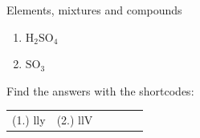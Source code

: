\begin{exercises}{Elements, mixtures and compounds}
{\begin{enumerate}[noitemsep, label=\textbf{\arabic*}. ]
\begin{enumerate}[noitemsep, label=\textbf{\alph*}. ]
\label{m38708*uid33}\item $\text{H}{}_{2}\text{SO}{}_{4}$\label{m38708*uid34}\item $\text{SO}{}_{3}$\end{enumerate}
                \end{enumerate}
    \label{m38708*cid4}
\par {} Find the answers with the shortcodes:
 \par \begin{tabular}[h]{cccccc}
 (1.) lly  &  (2.) llV  & \end{tabular}}
\end{exercises}
